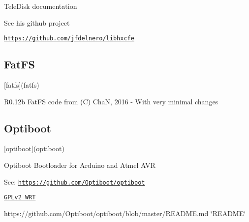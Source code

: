 \begin{DoxyItemize}
\begin{DoxyItemize}
\begin{DoxyItemize}
\begin{DoxyItemize}
\begin{DoxyItemize}
\begin{DoxyItemize}
\item Tele\+Disk documentation
\end{DoxyItemize}
\item See his github project
\begin{DoxyItemize}
\item \href{https://github.com/jfdelnero/libhxcfe}{\tt https\+://github.\+com/jfdelnero/libhxcfe}
\end{DoxyItemize}
\end{DoxyItemize}
\end{DoxyItemize}
\end{DoxyItemize}
\end{DoxyItemize}
\end{DoxyItemize}

\subsection*{Fat\+FS}


\begin{DoxyItemize}
\item \mbox{[}fatfs\mbox{]}(fatfs)
\begin{DoxyItemize}
\item R0.\+12b Fat\+FS code from (C) ChaN, 2016 -\/ With very minimal changes
\end{DoxyItemize}
\end{DoxyItemize}

\subsection*{Optiboot}


\begin{DoxyItemize}
\item \mbox{[}optiboot\mbox{]}(optiboot)
\begin{DoxyItemize}
\item Optiboot Bootloader for Arduino and Atmel A\+VR
\item See\+: \href{https://github.com/Optiboot/optiboot}{\tt https\+://github.\+com/\+Optiboot/optiboot}
\begin{DoxyItemize}
\item \href{https://github.com/Optiboot/optiboot/blob/master/LICENSE}{\tt G\+P\+Lv2 W\+RT}
\item https\+://github.com/\+Optiboot/optiboot/blob/master/\+R\+E\+A\+D\+M\+E.\+md \char`\"{}\+R\+E\+A\+D\+M\+E\char`\"{}
\end{DoxyItemize}
\end{DoxyItemize}
\end{DoxyItemize}

